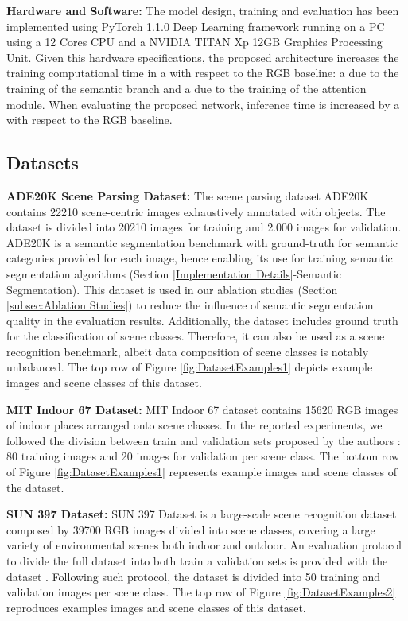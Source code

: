 \documentclass[review, 3p, sort&compress]{elsarticle}
\begin{document}
\textbf{Hardware and Software:} The model design, training and evaluation has been implemented using PyTorch 1.1.0 Deep Learning framework \cite{paszke2017automatic} running on a PC using a 12 Cores CPU and a NVIDIA TITAN Xp 12GB Graphics Processing Unit. Given this hardware specifications, the proposed architecture increases the training computational time in a  with respect to the RGB baseline: a  due to the training of the semantic branch and a  due to the training of the attention module. When evaluating the proposed network, inference time is increased by a  with respect to the RGB baseline.

\subsection{Datasets} \label{Datasets}
\textbf{ADE20K Scene Parsing Dataset:} The scene parsing dataset ADE20K \cite{zhou2017scene} contains 22210 scene-centric images exhaustively annotated with objects. The dataset is divided into 20210 images for training and 2.000 images for validation. ADE20K is a semantic segmentation benchmark with ground-truth for  semantic categories provided for each image, hence enabling its use for training semantic segmentation algorithms (Section \ref{Implementation Details}-Semantic Segmentation). This dataset is used in our ablation studies (Section \ref{subsec:Ablation Studies}) to reduce the influence of semantic segmentation quality in the evaluation results. Additionally, the dataset includes ground truth for the classification of  scene classes. Therefore, it can also be used as a scene recognition benchmark, albeit data composition of scene classes is notably unbalanced. The top row of Figure \ref{fig:DatasetExamples1} depicts example images and scene classes of this dataset.

\textbf{MIT Indoor 67 Dataset:} MIT Indoor 67 dataset \cite{quattoni2009recognizing} contains 15620 RGB images of indoor places arranged onto  scene classes. In the reported experiments, we followed the division between train and validation sets proposed by the authors \cite{quattoni2009recognizing}: 80 training images and 20 images for validation per scene class. The bottom row of Figure \ref{fig:DatasetExamples1} represents example images and scene classes of the dataset.

\textbf{SUN 397 Dataset:} SUN 397 Dataset \cite{xiao2010sun} is a large-scale scene recognition dataset composed by 39700 RGB images divided into  scene classes, covering a large variety of environmental scenes both indoor and outdoor. An evaluation protocol to divide the full dataset into both train a validation sets is provided with the dataset \cite{xiao2010sun}. Following such protocol, the dataset is divided into 50 training and validation images per scene class. The top row of Figure \ref{fig:DatasetExamples2} reproduces examples images and scene classes of this dataset.
\end{document}
